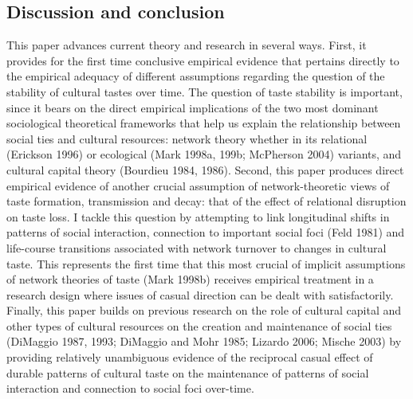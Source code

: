 \documentclass[
]{article}
\begin{document}
\subsection{Discussion and conclusion}\label{discussion-and-conclusion}

This paper advances current theory and research in several ways. First, it provides for the first time conclusive empirical evidence that pertains directly to the empirical adequacy of different assumptions regarding the question of the stability of cultural tastes over time. The question of taste stability is important, since it bears on the direct empirical implications of the two most dominant sociological theoretical frameworks that help us explain the relationship between social ties and cultural resources: network theory whether in its relational (Erickson 1996) or ecological (Mark 1998a, 199b; McPherson 2004) variants, and cultural capital theory (Bourdieu 1984, 1986). Second, this paper produces direct empirical evidence of another crucial assumption of network-theoretic views of taste formation, transmission and decay: that of the effect of relational disruption on taste loss. I tackle this question by attempting to link longitudinal shifts in patterns of social interaction, connection to important social foci (Feld 1981) and life-course transitions associated with network turnover to changes in cultural taste. This represents the first time that this most crucial of implicit assumptions of network theories of taste (Mark 1998b) receives empirical treatment in a research design where issues of casual direction can be dealt with satisfactorily. Finally, this paper builds on previous research on the role of cultural capital and other types of cultural resources on the creation and maintenance of social ties (DiMaggio 1987, 1993; DiMaggio and Mohr 1985; Lizardo 2006; Mische 2003) by providing relatively unambiguous evidence of the reciprocal casual effect of durable patterns of cultural taste on the maintenance of patterns of social interaction and connection to social foci over-time.
\end{document}
